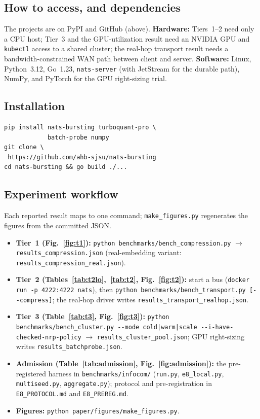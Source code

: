 \documentclass[conference]{IEEEtran}
\begin{document}
\subsection{How to access, and dependencies}
The projects are on PyPI and GitHub (above). \textbf{Hardware:} Tiers~1--2 need only a CPU host;
Tier~3 and the GPU-utilization result need an NVIDIA GPU and \texttt{kubectl} access to a shared
cluster; the real-hop transport result needs a bandwidth-constrained WAN path between client and
server. \textbf{Software:} Linux, Python~3.12, Go~1.23, \texttt{nats-server} (with JetStream for the
durable path), NumPy, and PyTorch for the GPU right-sizing trial.

\subsection{Installation}
\begin{verbatim}
pip install nats-bursting turboquant-pro \
            batch-probe numpy
git clone \
 https://github.com/ahb-sjsu/nats-bursting
cd nats-bursting && go build ./...
\end{verbatim}

\subsection{Experiment workflow}
Each reported result maps to one command; \texttt{make\_figures.py} regenerates the figures from
the committed JSON.
\begin{itemize}\itemsep1pt
\item \textbf{Tier~1 (Fig.~\ref{fig:t1}):} \texttt{python benchmarks/bench\_compression.py}
$\rightarrow$ \texttt{results\_compression.json} (real-embedding variant:
\texttt{results\_compression\_real.json}).
\item \textbf{Tier~2 (Tables~\ref{tab:t2lo},~\ref{tab:t2}, Fig.~\ref{fig:t2}):} start a bus
(\texttt{docker run -p 4222:4222 nats}), then \texttt{python benchmarks/bench\_transport.py
[-{}-compress]}; the real-hop driver writes \texttt{results\_transport\_realhop.json}.
\item \textbf{Tier~3 (Table~\ref{tab:t3}, Fig.~\ref{fig:t3}):} \texttt{python
benchmarks/bench\_cluster.py -{}-mode cold|warm|scale -{}-i-have-checked-nrp-policy} $\rightarrow$
\texttt{results\_cluster\_pool.json}; GPU right-sizing writes \texttt{results\_batchprobe.json}.
\item \textbf{Admission (Table~\ref{tab:admission}, Fig.~\ref{fig:admission}):} the pre-registered
harness in \texttt{benchmarks/infocom/} (\texttt{run.py}, \texttt{e8\_local.py},
\texttt{multiseed.py}, \texttt{aggregate.py}); protocol and pre-registration in
\texttt{E8\_PROTOCOL.md} and \texttt{E8\_PREREG.md}.
\item \textbf{Figures:} \texttt{python paper/\allowbreak figures/\allowbreak make\_figures.py}.
\end{itemize}
\end{document}
